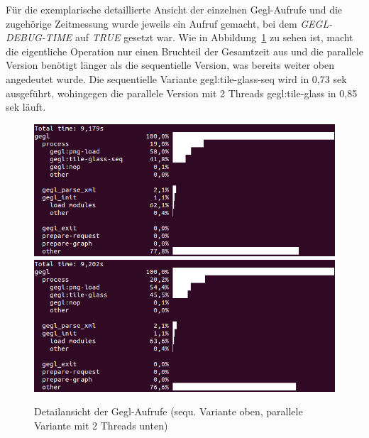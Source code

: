 Für die exemplarische detaillierte Ansicht der einzelnen Gegl-Aufrufe und die zugehörige Zeitmessung wurde jeweils ein Aufruf gemacht, bei dem \emph{GEGL-DEBUG-TIME} auf \emph{TRUE} gesetzt war. Wie in Abbildung~\ref{fig:gtile-dias} zu sehen ist, macht die eigentliche Operation nur einen Bruchteil der Gesamtzeit aus und die parallele Version benötigt länger als die sequentielle Version, was bereits weiter oben angedeutet wurde. Die sequentielle Variante gegl:tile-glass-seq wird in 0,73 sek ausgeführt, wohingegen die parallele Version mit 2 Threads gegl:tile-glass in 0,85 sek läuft.

\begin{figure}[h]
\begin{center}
\includegraphics[width=1.0\textwidth]{gtile_seq_dia.png}
\includegraphics[width=1.0\textwidth]{gtile_par_dia.png}
\end{center}
\caption{Detailansicht der Gegl-Aufrufe (sequ. Variante oben, parallele Variante mit 2 Threads unten)}\label{fig:gtile-dias}
\end{figure}
